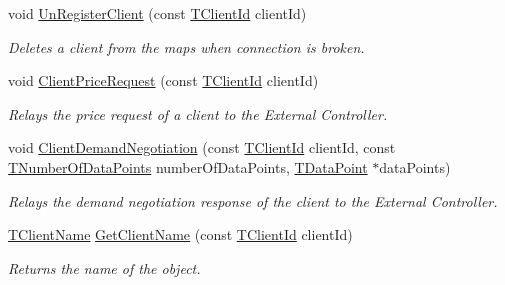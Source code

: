 \begin{DoxyCompactItemize}
void \hyperlink{class_control_manager_ac3c913a01fe2e5e5467ad3d140c8e9a2}{Un\-Register\-Client} (const \hyperlink{class_control_manager_a1bff13cab35db39c43f81f49b56e4849}{T\-Client\-Id} client\-Id)
\begin{DoxyCompactList}\small\item\em Deletes a client from the maps when connection is broken. \end{DoxyCompactList}\item 
void \hyperlink{class_control_manager_aa4398a05586d9b711aa6101334deefe1}{Client\-Price\-Request} (const \hyperlink{class_control_manager_a1bff13cab35db39c43f81f49b56e4849}{T\-Client\-Id} client\-Id)
\begin{DoxyCompactList}\small\item\em Relays the price request of a client to the External Controller. \end{DoxyCompactList}\item 
void \hyperlink{class_control_manager_a5b551f560431d0bb0bcf6c338bac8eb3}{Client\-Demand\-Negotiation} (const \hyperlink{class_control_manager_a1bff13cab35db39c43f81f49b56e4849}{T\-Client\-Id} client\-Id, const \hyperlink{class_control_manager_a90ca5d46699df9c6e67c96e36727eff1}{T\-Number\-Of\-Data\-Points} number\-Of\-Data\-Points, \hyperlink{class_control_manager_a236ef5279ad4f3082443e4c6d300a7d2}{T\-Data\-Point} $\ast$data\-Points)
\begin{DoxyCompactList}\small\item\em Relays the demand negotiation response of the client to the External Controller. \end{DoxyCompactList}\item 
\hyperlink{class_control_manager_ae9c86c5286c9ebf222ea44b60c463872}{T\-Client\-Name} \hyperlink{class_control_manager_a927449c3a4ba8a5bdc23e3747d5bb077}{Get\-Client\-Name} (const \hyperlink{class_control_manager_a1bff13cab35db39c43f81f49b56e4849}{T\-Client\-Id} client\-Id)
\begin{DoxyCompactList}\small\item\em Returns the name of the object. \end{DoxyCompactList}\end{DoxyCompactItemize}
